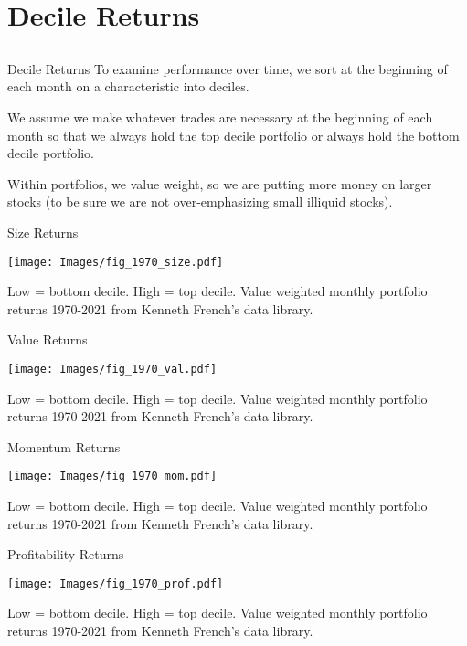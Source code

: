 \documentclass[xcolor=dvipsnames,10pt]{beamer}
\begin{document}
\section{Decile Returns}\subsection{}

\begin{frame}{Decile Returns}
    To examine performance over time, we sort at the beginning of each month on a characteristic into deciles.
    
    We assume we make whatever trades are necessary at the beginning of each month so that we always hold the top decile portfolio or always hold the bottom decile portfolio.
    
    Within portfolios, we value weight, so we are putting more money on larger stocks (to be sure we are not over-emphasizing small illiquid stocks). 
\end{frame}

\begin{frame}{Size Returns}
     \begin{center}
        \texttt{[image: Images/fig\_1970\_size.pdf]}
    \end{center}
    Low = bottom decile.  High = top decile.  Value weighted monthly portfolio returns 1970-2021 from Kenneth French's data library.
\end{frame}

\begin{frame}{Value Returns}
     \begin{center}
        \texttt{[image: Images/fig\_1970\_val.pdf]}
    \end{center}
    Low = bottom decile.  High = top decile.  Value weighted monthly portfolio returns 1970-2021 from Kenneth French's data library.
\end{frame}

\begin{frame}{Momentum Returns}
     \begin{center}
        \texttt{[image: Images/fig\_1970\_mom.pdf]}
    \end{center}
    Low = bottom decile.  High = top decile.  Value weighted monthly portfolio returns 1970-2021 from Kenneth French's data library.
\end{frame}

\begin{frame}{Profitability Returns}
     \begin{center}
        \texttt{[image: Images/fig\_1970\_prof.pdf]}
    \end{center}
    Low = bottom decile.  High = top decile.  Value weighted monthly portfolio returns 1970-2021 from Kenneth French's data library.
\end{frame}
\end{document}
